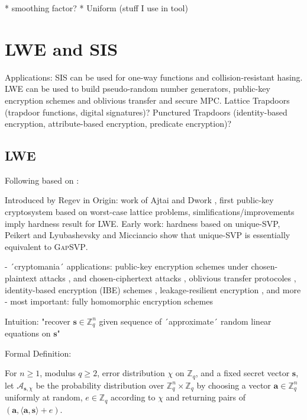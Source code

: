 \documentclass[
  a4paper,  %
  twoside,  %
  bibliography=totoc,
  headsepline,
  cleardoublepage=empty,
  parskip=half,
  draft=false
]{scrbook}
\begin{document}
    * smoothing factor? 
    * Uniform (stuff I use in tool)







\section{LWE and SIS}
Applications: SIS can be used for one-way functions and collision-resistant hasing. LWE can be used to build pseudo-random number generators, public-key encryption schemes and oblivious transfer and secure MPC. Lattice Trapdoors (trapdoor functions, digital signatures)? Punctured Trapdoors (identity-based encryption, attribute-based encryption, predicate encryption)? %

\subsection{LWE}
Following based on \cite{Reg10}:%

Introduced by Regev in \cite{Reg09}
Origin: work of Ajtai and Dwork \cite{AD97}, first public-key cryptosystem based on worst-case lattice problems, simlifications/improvements \cite{GGH97b, Reg03} imply hardness result for LWE. 
Early work: hardness based on unique-SVP, Peikert \cite{Pei09} and Lyubashevsky and Micciancio \cite{LM09} show that unique-SVP is essentially equivalent to \textsc{GapSVP}.

- ´cryptomania´ applications: public-key encryption schemes under chosen-plaintext attacks \cite{Reg05, KTX07, PVW08}, and chosen-ciphertext attacks \cite{PW08, Pei09}, oblivious transfer protocoles \cite{PVW08}, identity-based encryption (IBE) schemes \cite{GPV08, CHKP10, ABB10}, leakage-resilient encryption \cite{AGV09, ACPS09, DGKPV10, GKPV10}, and more %
- most important: fully homomorphic encryption schemes \cite{Gen09a, BV11, Bra12, GSW13} %

Intuition: "recover $\textbf{s} \in \mathbb{Z}_q^n$ given sequence of ´approximate´ random linear equations on $\textbf{s}$" 

Formal Definition: 
\begin{definition} %
  For $n \geq 1$, modulus $q \geq 2$, error distribution $\chi$ on $\mathbb{Z}_q$, and a fixed secret vector $\textbf{s}$, let $\mathcal{A}_{\textbf{s}, \chi}$ be the probability distribution over $\mathbb{Z}_q^n \times \mathbb{Z}_q$ by choosing a vector $\textbf{a} \in \mathbb{Z}_q^n$ uniformly at random, $e \in \mathbb{Z}_q$ according to $\chi$ and returning pairs of $(\textbf{a}, \langle \textbf{a}, \textbf{s} \rangle + e)$.
\end{definition}
\end{document}
